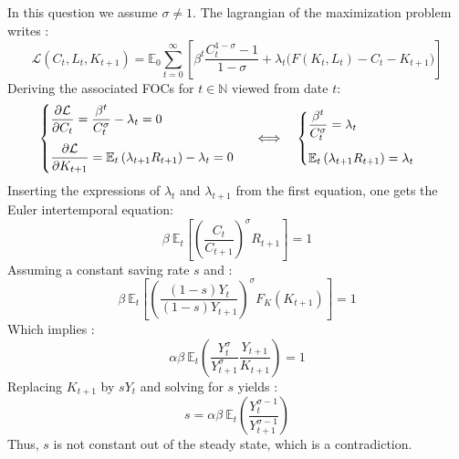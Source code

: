 \documentclass[12pt]{article}
\begin{document}
\subsection{}
In this question we assume $\sigma \not= 1$.
The lagrangian of the maximization problem writes :
\begin{equation*}
    \mathcal{L}(C_t,L_t,K_{t+1}) = \mathbb{E}_0\sum_{t=0}^{\infty} \left[ \beta^t \frac{C_t^{1-\sigma} - 1}{1-\sigma} + \lambda_t \Big( F(K_t, L_t) - C_t - K_{t+1} \Big) \right]
\end{equation*}
Deriving the associated FOCs for $t \in \mathbb{N}$ viewed from date $t$:
\[
\begin{cases}
    \begin{array}{@{}l}
        \displaystyle \frac{\partial \mathcal{L}}{\partial C_t} =  \frac{\beta^t}{C_t^{\sigma}} - \lambda_t = 0\\[12pt]
        \displaystyle \frac{\partial \mathcal{L}}{\partial K_{t+1}} = \mathbb{E}_t \left( \lambda_{t+1} R_{t+1} \right) - \lambda_t = 0\\
    \end{array}
\end{cases}
\Longleftrightarrow \quad
\begin{cases}
    \begin{array}{@{}l}
        \displaystyle \frac{\beta^t}{C_t^{\sigma}} = \lambda_t\\[12pt]
        \displaystyle \mathbb{E}_t \left( \lambda_{t+1} R_{t+1} \right) = \lambda_t\\
    \end{array}
\end{cases}
\]
Inserting the expressions of $\lambda_t$ and $\lambda_{t+1}$ from the first equation, one gets the Euler intertemporal equation: 
\begin{equation*}
   \beta~\mathbb{E}_t \left[ \left( \frac{C_t}{C_{t+1}} \right)^{\sigma} R_{t+1} \right] = 1
\end{equation*}
Assuming a constant saving rate $s$ and :
\begin{equation*}
   \beta~\mathbb{E}_t \left[ \left(\frac{(1 - s)Y_t}{(1-s)Y_{t+1}}\right)^{\sigma}  F_K(K_{t+1}) \right] = 1
\end{equation*}
Which implies :
\begin{equation*}
   \alpha \beta~\mathbb{E}_t \left( \frac{Y_t^{\sigma}}{Y_{t+1}^{\sigma}} \frac{Y_{t+1}}{K_{t+1}} \right) = 1
\end{equation*}
Replacing $K_{t+1}$ by $sY_t$ and solving for $s$ yields :
\begin{equation*}
   s = \alpha \beta~\mathbb{E}_t \left( \frac{Y_t^{\sigma-1}}{Y_{t+1}^{\sigma-1}} \right)
\end{equation*}
Thus, $s$ is not constant out of the steady state, which is a contradiction.
\end{document}
